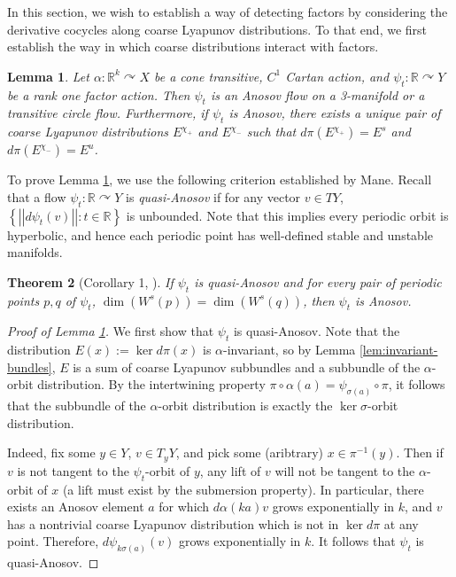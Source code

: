\documentclass[12pt]{amsart}
\newtheorem{theorem}{Theorem}[section]
\newtheorem{lemma}[theorem]{Lemma}
\theoremstyle{definition}
\theoremstyle{remark}
\numberwithin{equation}{section}
\newcommand{\R}{\mathbb{R}}
\newcommand{\set}[1]{\left\lbrace #1 \right\rbrace}
\newcommand{\norm}[1]{{\left|\left| #1 \right|\right|}}
\newcommand{\of}{\circ}
\newtheorem{Structural Stability Theorem}[theorem]{Structural Stability Theorem}
\begin{document}
{In this section, we wish to establish a way of detecting factors by considering the derivative cocycles along coarse Lyapunov distributions. To that end, we first establish the way in which coarse distributions interact with factors.

\begin{lemma}
\label{lem:factors-anosov}
Let $\alpha : \R^k \curvearrowright X$ be a cone transitive, $C^1$ Cartan action, and $\psi_t : \R \curvearrowright Y$ be a rank one factor action. Then $\psi_t$ is an Anosov flow on a 3-manifold or a transitive circle flow. Furthermore, if $\psi_t$ is Anosov, there exists a unique pair of coarse Lyapunov distributions $E^{\chi_+}$ and $E^{\chi_-}$ such that $d\pi(E^{\chi_+}) = E^s$ and $d\pi(E^{\chi_-}) = E^u$.
\end{lemma}

To prove Lemma \ref{lem:factors-anosov}, we use the following criterion established by Mane. Recall that a flow $\psi_t : \R \curvearrowright Y$ is {\it quasi-Anosov} if for any vector $v \in TY$, $\set{\norm{d\psi_t(v)} : t \in \R}$ is unbounded. Note that this implies every periodic orbit is hyperbolic, and hence each periodic point has well-defined stable and unstable manifolds. 

\begin{theorem}[Corollary 1, \cite{maneQuasi}]
If $\psi_t$ is quasi-Anosov and for every pair of periodic points $p,q$ of $\psi_t$, $\dim(W^s(p)) = \dim(W^s(q))$, then $\psi_t$ is Anosov.
\end{theorem}


\begin{proof}[Proof of Lemma \ref{lem:factors-anosov}]
We first show that $\psi_t$ is quasi-Anosov. Note that the distribution $E(x) := \ker d\pi(x)$ is $\alpha$-invariant, so by Lemma \ref{lem:invariant-bundles}, $E$ is a sum of coarse Lyapunov subbundles and a subbundle of the $\alpha$-orbit distribution. By the intertwining property $\pi \of \alpha(a) = \psi_{\sigma(a)} \of \pi$, it follows that the subbundle of the $\alpha$-orbit distribution is exactly the $\ker \sigma$-orbit distribution.

 Indeed, fix some $y \in Y$, $v \in T_yY$, and pick some (aribtrary) $x \in \pi^{-1}(y)$. Then if $v$ is not tangent to the $\psi_t$-orbit of $y$, any lift of $v$ will not be tangent to the $\alpha$-orbit of $x$ (a lift must exist by the submersion property). In particular, there exists an Anosov element $a$ for which $d\alpha(ka)v$ grows exponentially in $k$, and $v$ has a nontrivial coarse Lyapunov distribution which is not in $\ker d\pi$ at any point. Therefore,  $d\psi_{k\sigma(a)}(v)$ grows exponentially in $k$. It follows that $\psi_t$ is quasi-Anosov.
 

\end{proof}}
\end{document}
